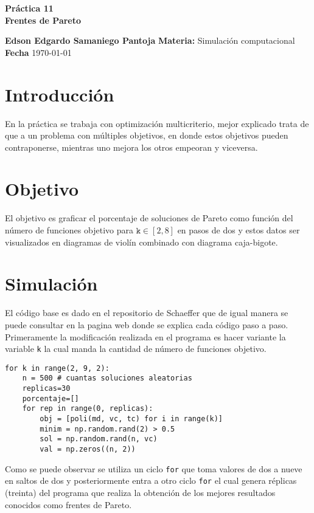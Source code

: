 \documentclass[a4paper, 11pt]{article}
\begin{document}
\begin{center}
\LARGE \bf Pr\'actica 11\\ Frentes de Pareto
\end{center}

\vspace{1cm} 
\noindent\textbf {Edson Edgardo Samaniego Pantoja} \hfill \textbf{Materia:} Simulación computacional 
\hfill \\
\textbf{Fecha} \today  
\vspace{1cm} 

\section{Introducción}
En la práctica se trabaja con optimización multicriterio, mejor explicado trata de que a un problema con múltiples objetivos, en donde estos objetivos pueden contraponerse, mientras uno mejora los otros empeoran y viceversa. 

\section{Objetivo}
El objetivo es graficar el porcentaje de soluciones de Pareto como función del número de funciones objetivo para $\texttt{k} \in \left[ 2, 8 \right]$ en pasos de dos y estos datos ser visualizados en diagramas de violín combinado con diagrama caja-bigote.

\section{Simulación}
El código base es dado en el repositorio de Schaeffer \cite{elisa} que de igual manera se puede consultar en la pagina web \cite{dra} donde se explica cada código paso a paso.
Primeramente la modificación realizada en el programa es hacer variante la variable \texttt{k} la cual manda la cantidad de número de funciones objetivo.

\begin{verbatim}
for k in range(2, 9, 2):
    n = 500 # cuantas soluciones aleatorias
    replicas=30
    porcentaje=[]
    for rep in range(0, replicas):
        obj = [poli(md, vc, tc) for i in range(k)]
        minim = np.random.rand(2) > 0.5
        sol = np.random.rand(n, vc)
        val = np.zeros((n, 2))
\end{verbatim}
Como se puede observar se utiliza un ciclo \texttt{for} que toma valores de dos a nueve en saltos de dos y posteriormente entra a otro ciclo \texttt{for} el cual genera réplicas (treinta) del programa que realiza la obtención de los mejores resultados conocidos como frentes de Pareto.
\end{document}
